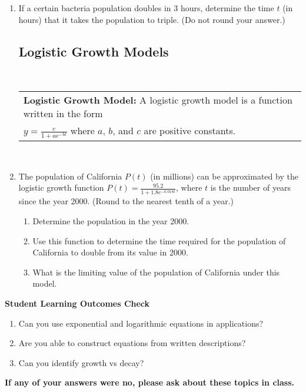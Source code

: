 \begin{enumerate}
\item If a certain bacteria population doubles in 3 hours, determine the time $t$ (in hours) that it takes the population to triple. (Do not round your answer.)\\[2in]

\newpage

\subsection{Logistic Growth Models} ~

\noindent \begin{tabular}{| l |} \hline
\textbf{Logistic Growth Model:  } A logistic growth model is a function written in the form \\
$\displaystyle y=\frac{c}{1+ae^{-bt}}$ where $a$, $b$, and $c$ are positive constants.
\\ \hline
\end{tabular} \\

\item The population of California $P(t)$ (in millions) can be approximated by the logistic growth function $\displaystyle P(t)=\frac{95.2}{1+1.8e^{-0.018t}}$, where $t$ is the number of years since the year 2000. (Round to the nearest tenth of a year.)

\begin{enumerate}
\item Determine the population in the year 2000.\\[.5in]
\item Use this function to determine the time required for the population of California to double from its value in 2000.\vfill
\item What is the limiting value of the population of California under this model.\\[1in]
\end{enumerate}

\end{enumerate}

\noindent \textbf{Student Learning Outcomes Check}

\begin{enumerate}
\item Can you use exponential and logarithmic equations in applications?
\item Are you able to construct equations from written descriptions?
\item Can you identify growth vs decay?
\end{enumerate}

\noindent \textbf{If any of your answers were no, please ask about these topics in class.}




